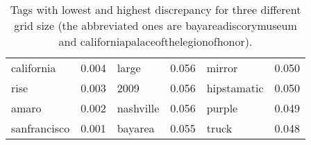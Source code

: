 \begin{table}[p]
\begin{tabular}{lclclc}
california    & 0.004 & large       & 0.056 & mirror      & 0.050 \\
rise          & 0.003 & 2009        & 0.056 & hipstamatic & 0.050 \\
amaro         & 0.002 & nashville   & 0.056 & purple      & 0.049 \\
sanfrancisco  & 0.001 & bayarea     & 0.055 & truck       & 0.048 \\
\bottomrule
\end{tabular}
\caption{Tags with lowest and highest discrepancy for three different grid
size (the abbreviated ones are \textsf{bayareadiscorymuseum} and
	\textsf{californiapalaceofthelegionofhonor}).\label{t:disc}}
\end{table}
\restoregeometry

